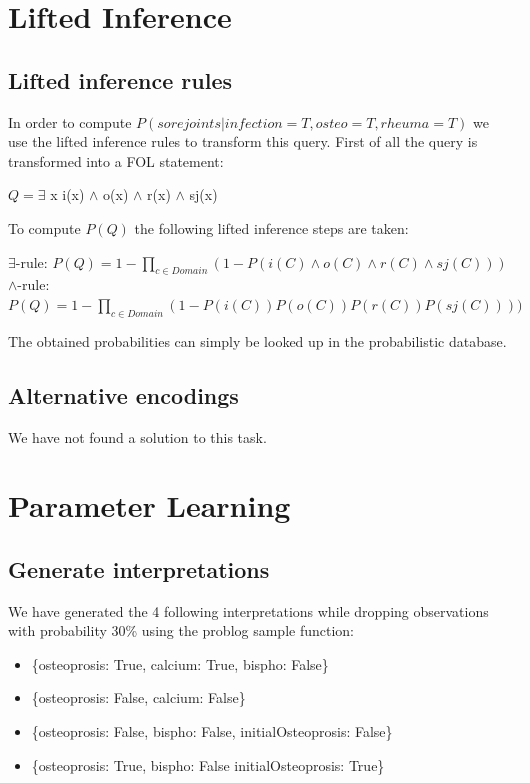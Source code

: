 \documentclass{article}
\begin{document}
\section{Lifted Inference}
\subsection{Lifted inference rules}
In order to compute $P(sorejoints|infection=T,osteo=T,rheuma=T)$ we use the lifted inference rules to transform this query. First of all the query is transformed into a FOL statement:
\begin{center}
    $Q = \exists$ x i(x) $\land$ o(x) $\land$ r(x) $\land$ sj(x)
\end{center}
To compute $P(Q)$ the following lifted inference steps are taken:
\begin{center}
    $\exists$-rule: $P(Q) = 1 - \prod_{c \in Domain} (1-P(i(C)\land o(C) \land r(C) \land sj(C))) $\\
    $\land$-rule: $P(Q) = 1 - \prod_{c \in Domain} (1-P(i(C))P(o(C))P(r(C))P(sj(C)))) $\\
\end{center}
The obtained probabilities can simply be looked up in the probabilistic database.

\subsection{Alternative encodings}
We have not found a solution to this task.


\section{Parameter Learning}
\subsection{Generate interpretations}
We have generated the 4 following interpretations while dropping observations with probability 30\% using the problog sample function:
\begin{itemize}
    \item\{osteoprosis: True, calcium: True, bispho: False\}
    \item\{osteoprosis: False, calcium: False\}
    \item\{osteoprosis: False, bispho: False, initialOsteoprosis: False\}
    \item\{osteoprosis: True, bispho: False initialOsteoprosis: True\}
\end{itemize}
\end{document}
